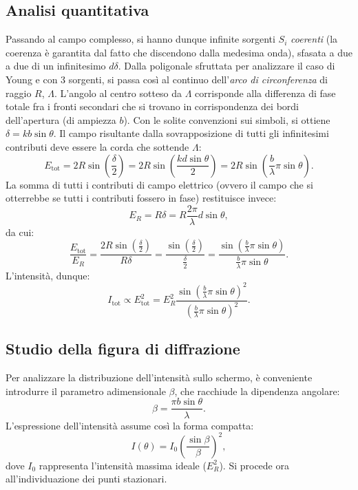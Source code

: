 \documentclass[a4paper,11pt]{report}
\begin{document}
\subsection{Analisi quantitativa}
Passando al campo complesso, si hanno dunque infinite sorgenti $S_i$ \textit{coerenti} (la coerenza è garantita dal fatto che discendono dalla medesima onda), sfasata a due a due di un infinitesimo $d\delta$. Dalla poligonale sfruttata per analizzare il caso di Young e con 3 sorgenti, si passa così al continuo dell'\textit{arco di circonferenza} di raggio $R$, $\Lambda$. L'angolo al centro sotteso da $\Lambda$ corrisponde alla differenza di fase totale fra i fronti secondari che si trovano in corrispondenza dei bordi dell'apertura (di ampiezza $b$). Con le solite convenzioni sui simboli, si ottiene $\delta = kb\sin\theta$. Il campo risultante dalla sovrapposizione di tutti gli infinitesimi contributi deve essere la corda che sottende $\Lambda$:
\begin{equation}
    E_{\text{tot}} = 2R\sin\left(\frac{\delta}{2}\right) = 2R\sin\left(\frac{kd\sin\theta}{2}\right) = 2R\sin\left(\frac{b}{\lambda}\pi \sin\theta\right).
\end{equation}
La somma di tutti i contributi di campo elettrico (ovvero il campo che si otterrebbe se tutti i contributi fossero in fase) restituisce invece:
\begin{equation}
    E_{R} = R\delta = R \frac{2\pi}{\lambda}d\sin \theta,
\end{equation}
da cui:
\begin{equation}
    \frac{E_{\text{tot}}}{E_R} = \frac{2R\sin\left(\frac{\delta}{2}\right)}{R\delta} = \frac{\sin\left(\frac{\delta}{2}\right)}{\frac{\delta}{2}} = \frac{\sin\left(\frac{b}{\lambda}\pi \sin\theta\right)}{ \frac{b}{\lambda}\pi\sin \theta}.
\end{equation}
L'intensità, dunque:
\begin{equation}
   I_{\text{tot}} \propto E_{\text{tot}}^2 = E_R^2 \frac{\sin\left(\frac{b}{\lambda}\pi \sin\theta\right)^2}{\left( \frac{b}{\lambda}\pi\sin \theta\right)^2}.
\end{equation}

\subsection{Studio della figura di diffrazione}
Per analizzare la distribuzione dell'intensità sullo schermo, è conveniente introdurre il parametro adimensionale $\beta$, che racchiude la dipendenza angolare:
\begin{equation}
    \beta = \frac{\pi b \sin\theta}{\lambda}.
\end{equation}
L'espressione dell'intensità assume così la forma compatta:
\begin{equation}
    I(\theta) = I_0 \left( \frac{\sin\beta}{\beta} \right)^2,
\end{equation}
dove $I_0$ rappresenta l'intensità massima ideale ($E_R^2$). Si procede ora all'individuazione dei punti stazionari.
\end{document}
